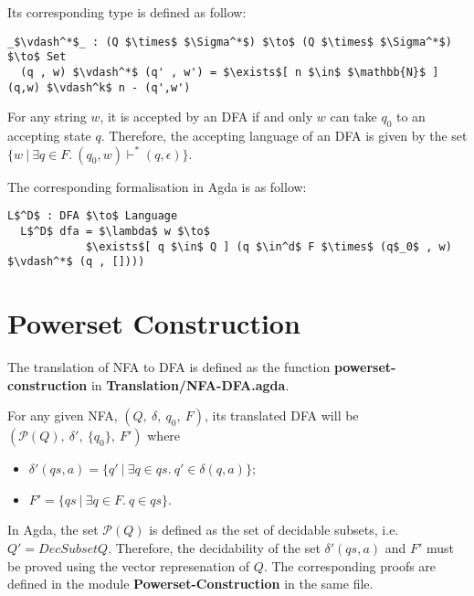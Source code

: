 \par Its corresponding type is defined as follow: 
\begin{lstlisting}[mathescape=true,xleftmargin=.3\textwidth]
  _$\vdash^*$_ : (Q $\times$ $\Sigma^*$) $\to$ (Q $\times$ $\Sigma^*$) $\to$ Set
  (q , w) $\vdash^*$ (q' , w') = $\exists$[ n $\in$ $\mathbb{N}$ ] (q,w) $\vdash^k$ n - (q',w')
\end{lstlisting}

\begin{defn}
\noindent For any string \(w\), it is accepted by an DFA
if and only \(w\) can take \(q_0\) to an accepting state \(q\). Therefore, the
accepting language of an DFA is given by the set \(\{w\ |\ \exists q\in F.\ (q_0,w) \vdash^* (q,\epsilon)\}\). 
\end{defn}

\par The corresponding formalisation in Agda is as follow: 
\begin{lstlisting}[mathescape=true,xleftmargin=.3\textwidth]
  L$^D$ : DFA $\to$ Language
  L$^D$ dfa = $\lambda$ w $\to$ 
            $\exists$[ q $\in$ Q ] (q $\in^d$ F $\times$ (q$_0$ , w) $\vdash^*$ (q , [])))
\end{lstlisting} 


\section{Powerset Construction}
\par The translation of NFA to DFA is defined as the function
\textbf{powerset-construction} in \textbf{Translation/NFA-DFA.agda}. 

\begin{defn}
\label{defn:powerset}
\noindent For any given NFA, \((Q,\ \delta,\ q_0,\ F)\), its
translated DFA will be \((\mathcal P \left({Q}\right),\ \delta',\ \{q_0\},\ F')\) where
\begin{itemize}[nolistsep]
  \item \(\delta'(qs,a) = \{q'\ |\ \exists q\in qs.\ q' \in \delta (q,a)\}\);
  \item \(F' = \{qs\ |\ \exists q\in F.\ q \in qs\}\). 
\end{itemize}
\end{defn}

\par In Agda, the set \(\mathcal P \left({Q}\right)\) is defined as
the set of decidable subsets, i.e. \(Q' = DecSubset Q\). Therefore,
the decidability of the set \(\delta'(qs,a)\) and \(F'\) must be
proved using the vector represenation of \(Q\). The corresponding
proofs are defined in the module \textbf{Powerset-Construction} in the
same file. 

